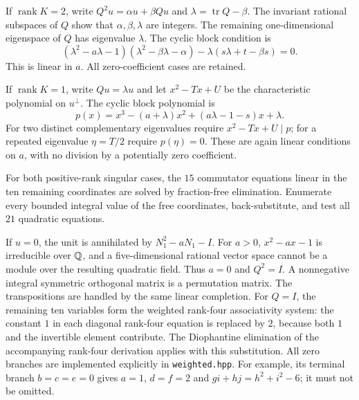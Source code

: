\documentclass[11pt,a4paper]{article}
\theoremstyle{definition}\newtheorem{definition}[theorem]{Definition}\newtheorem{remark}[theorem]{Remark}
\begin{document}
If $\operatorname{rank}K=2$, write $Q^2u=\alpha u+\beta Qu$ and
$\lambda=\operatorname{tr}Q-\beta$. The invariant rational subspaces of
$Q$ show that $\alpha,\beta,\lambda$ are integers. The remaining
one-dimensional eigenspace of $Q$ has eigenvalue $\lambda$. The cyclic
block condition is
\begin{equation}\label{eq:ranktwo}
(\lambda^2-a\lambda-1)(\lambda^2-\beta\lambda-\alpha)
-\lambda(s\lambda+t-\beta s)=0.
\end{equation}
This is linear in $a$. All zero-coefficient cases are retained.

If $\operatorname{rank}K=1$, write $Qu=\lambda u$ and let
$x^2-Tx+U$ be the characteristic polynomial on $u^\perp$.
The cyclic block polynomial is
\[
p(x)=x^3-(a+\lambda)x^2+(a\lambda-1-s)x+\lambda.
\]
For two distinct complementary eigenvalues require $x^2-Tx+U\mid p$;
for a repeated eigenvalue $\eta=T/2$ require $p(\eta)=0$.
These are again linear conditions on $a$, with no division by a
potentially zero coefficient.

For both positive-rank singular cases, the $15$ commutator equations
linear in the ten remaining coordinates are solved by fraction-free
elimination. Enumerate every bounded integral value of the free
coordinates, back-substitute, and test all $21$ quadratic equations.

If $u=0$, the unit is annihilated by $N_1^2-aN_1-I$.
For $a>0$, $x^2-ax-1$ is irreducible over $\mathbb Q$, and a five-dimensional
rational vector space cannot be a module over the resulting quadratic
field. Thus $a=0$ and $Q^2=I$. A nonnegative integral symmetric
orthogonal matrix is a permutation matrix. The transpositions are
handled by the same linear completion. For $Q=I$, the remaining ten
variables form the weighted rank-four associativity system: the constant
$1$ in each diagonal rank-four equation is replaced by $2$, because
both $1$ and the invertible element contribute. The Diophantine
elimination of the accompanying rank-four derivation applies with this substitution.
All zero branches are implemented explicitly in \texttt{weighted.hpp}.
For example, its terminal branch $b=c=e=0$ gives $a=1$, $d=f=2$ and
$gi+hj=h^2+i^2-6$; it must not be omitted.
\end{document}
